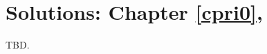 \chapter[Solutions: Chapter \ref{cpri0}]
        {Solutions: Chapter \ref{cpri0}, \cprizerolongtitle{}}

\label{cprs0}

TBD.




